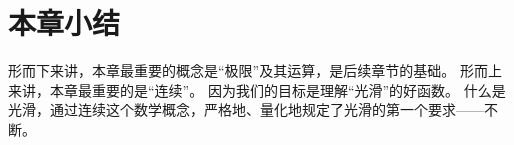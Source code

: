 \section{本章小结}

形而下来讲，本章最重要的概念是“极限”及其运算，是后续章节的基础。
形而上来讲，本章最重要的是“连续”。
因为我们的目标是理解“光滑”的好函数。
什么是光滑，通过连续这个数学概念，严格地、量化地规定了光滑的第一个要求——不断。




